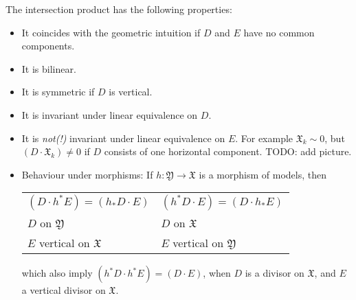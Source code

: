 The intersection product has the following properties:
\begin{itemize}
	\item It coincides with the geometric intuition if $D$ and $E$ have no common components.
	\item It is bilinear.
	\item It is symmetric if $D$ is vertical.
	\item It is invariant under linear equivalence on $D$.
	\item It is \emph{not(!)} invariant under linear equivalence on $E$.
		For example $\mathfrak{X}_{k} \sim 0$, but $(D \cdot
		\mathfrak{X}_{k}) \ne 0$ if $D$ consists of one horizontal
		component. TODO: add picture.
	\item Behaviour under morphisms: If $h \colon \mathfrak{Y} \to
		\mathfrak{X}$ is a morphism of models, then
		\begin{center}
			\begin{tabular}{ll}
				$(D \cdot h^{*}E) = (h_{*}D \cdot E)$ &
				$(h^{*}D \cdot E) = (D \cdot h_{*}E)$ \\
				$D$ on $\mathfrak{Y}$ & $D$ on $\mathfrak{X}$ \\
				$E$ vertical on $\mathfrak{X}$ & $E$ vertical on $\mathfrak{Y}$
			\end{tabular}
		\end{center}
		which also imply $(h^{*}D \cdot h^{*}E) = (D \cdot E)$, when
		$D$ is a divisor on $\mathfrak{X}$, and $E$ a vertical divisor
		on $\mathfrak{X}$.
\end{itemize}

